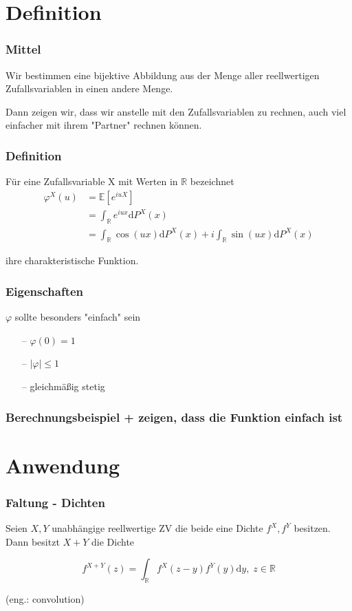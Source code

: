 \documentclass{beamer}
\newcommand{\R}{\mathbb{R}}
\newcommand{\E}{\mathbb{E}}
\newcommand\dint{\mathord{\mathrm{d}}}
\begin{document}
\section{Definition}

\begin{frame}
\frametitle{Mittel}
Wir bestimmen eine bijektive Abbildung aus der Menge aller reellwertigen Zufallsvariablen in einen andere Menge.

Dann zeigen wir, dass wir anstelle mit den Zufallsvariablen zu rechnen, auch viel einfacher mit ihrem "Partner" rechnen können.
\end{frame}

\begin{frame}
\frametitle{Definition}
Für eine Zufallsvariable X mit Werten in $\R$ bezeichnet
\begin{align} \label{eq1}
\varphi^X(u) &= \E[e^{iuX}] \\
 & = \int_{\R} e^{iux} \dint P^X(x)\\
 & = \int_{\R} \cos(ux) \dint P^X(x) + i \int_{\R} \sin(ux) \dint P^X(x)
\end{align}

ihre charakteristische Funktion.

\end{frame}

\begin{frame}
\frametitle{Eigenschaften}
$\varphi$ sollte besonders "einfach" sein
\hfill \newline
\begin{itemize}
    \setlength\itemsep{1em}
    \item[--] $\varphi(0) = 1$
    \item[--] $|\varphi| \leq 1$
    \item[--] gleichmäßig stetig
\end{itemize}
\end{frame}

\begin{frame}
\frametitle{Berechnungsbeispiel + zeigen, dass die Funktion einfach ist}
\end{frame}

\section{Anwendung}

\begin{frame}
\frametitle{Faltung - Dichten}
  Seien $X, Y$ unabhängige reellwertige ZV die beide eine Dichte $f^X, f^Y$ besitzen. Dann besitzt $X+Y$ die Dichte

\begin{equation*}
  f^{X+Y}(z) = \int_{\R} f^X(z - y)f^Y(y) \dint y, \; z \in \R
\end{equation*}

(eng.: convolution)
\end{frame}
\end{document}
